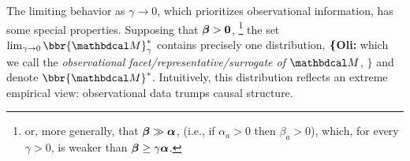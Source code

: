 \documentclass[twoside]{article}
\newcommand\obslimit{observational facet} %
\newcommand\voli[1]{{\color{olicolor}\textbf{$\boldsymbol\{$Oli: }#1 \textbf{$\boldsymbol\}$}}}
\begin{document}
The limiting behavior as $\gamma \to 0$, which prioritizes observational information, has some special properties.
Supposing that $\boldsymbol\beta > \mathbf{0}$,%
    \footnote{or, more generally, that $\boldsymbol\beta \gg \boldsymbol\alpha$,
        (i.e., if $\alpha_a>0$ then $\beta_a>0$), 
        which, for every $\gamma > 0$, is weaker than $\boldsymbol\beta \ge \gamma \boldsymbol\alpha$. }
the set $\lim_{\gamma\to 0}\bbr{\dg M}_\gamma^*$ contains precisely one
distribution, 
\voli{which we call the 
    \emph{\obslimit/representative/surrogate of $\dg M$},}
and denote $\bbr{\dg M}^*$.
Intuitively, this distribution
reflects an extreme empirical
view: observational data trumps causal structure.
\end{document}
